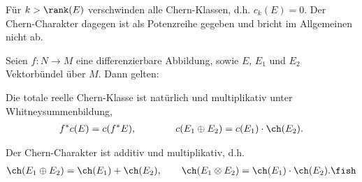 \documentclass[%
	paper=a5,%
	fleqn,%
	DIV=18,%
	BCOR=0mm,
	fontsize=11pt,
	titlepage=false,%
	bibliography=totoc,
	DIV=18,%
	twoside=true,
	pdftitle=Riemannsche Geometrie,
	pdfauthor=Uwe Semmelmann,
	numbers=noendperiod]%
	{scrbook}
\begin{document}
\begin{rem}
Für $k> \rank(E)$ verschwinden alle Chern-Klassen, d.h. $c_k(E) = 0$. Der
Chern-Charakter dagegen ist als Potenzreihe gegeben und bricht im Allgemeinen
nicht ab.\map
\end{rem}

\begin{lem}
Seien $f: N\to M$ eine differenzierbare Abbildung, sowie $E$, $E_1$ und $E_2$
Vektorbündel über $M$. Dann gelten:
\begin{propenum}
\item Die totale reelle Chern-Klasse ist natürlich und multiplikativ unter Whitneysummenbildung,
\begin{align*}
f^*c(E) = c(f^*E),\qquad\qquad c(E_1\oplus E_2) = c(E_1)\cdot \ch(E_2).
\end{align*}
\item Der Chern-Charakter ist additiv und multiplikativ, d.h.
\begin{align*}
\ch(E_1\oplus E_2 ) = \ch(E_1) + \ch(E_2),\qquad
\ch(E_1\otimes E_2) = \ch(E_1)\cdot\ch(E_2).\fish
\end{align*}
\end{propenum}
\end{lem}
\end{document}
